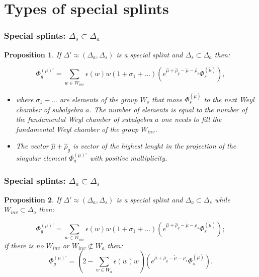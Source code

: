 \documentclass[pdftex]{beamer}
\newtheorem{Utv}{Proposition}
\theoremstyle{definition} \newtheorem{Def}{Definition}
\begin{document}
\section{Types of special splints}
\begin{frame}
  \frametitle{Special splints: $\Delta_s\subset\Delta_a$}
  \begin{Utv}
    If $\Delta'\approx\left(\Delta_a,\Delta_s\right)$ is a special splint and $\Delta_s\subset\Delta_a$ then:

    $$
    \Phi_g^{(\mu)'}=\sum_{w\in W_{inv}} \epsilon (w) w(1+\sigma_1+\dots)(e^{\hat\mu+\hat\rho_g-\tilde{\mu}-\tilde{\rho_s}}\Phi_s^{(\tilde{\mu})}),
    $$
    \begin{itemize}
      \item where $\sigma_1+\dots$ are elements of the group $W_s$ that move $\Phi_s^{(\tilde{\mu})}$ to the next Weyl chamber of subalgebra $a$. The number of elements is equal to the number of the fundamental Weyl chamber of subalgebra $a$ one needs to fill the fundamental Weyl chamber of the group $W_{inv}$. 

      \item The vector $\hat\mu+\hat\rho_g$ is vector of the highest lenght in the projection of the singular element $\Phi_g^{(\mu)'}$ with positive multiplicity.
      \end{itemize}
    \label{u3}
  \end{Utv}
\end{frame}

\begin{frame}
  \frametitle{Special splints: $\Delta_a\subset\Delta_s$}
  \begin{Utv}
    If $\Delta'\approx\left(\Delta_a,\Delta_s\right)$ is a special splint and $\Delta_a\subset\Delta_s$ while $W_{inv}\subset\Delta_a$ then:

    $$
    \Phi_g^{(\mu)'}=\sum_{w\in W_{inv}} \epsilon (w) w(1+\sigma_1+\dots)(e^{\hat\mu+\hat\rho_g-\tilde{\mu}-\rho_s}\Phi_s^{(\tilde{\mu})});
    $$
    if there is no $W_{inv}$ or $W_{inv}\not\subset W_a$ then:
    $$
    \Phi_g^{(\mu)'}=(2-\sum_{w\in W_a} \epsilon (w) w)(e^{\hat\mu+\hat\rho_g-\tilde{\mu}-\rho_s}\Phi_s^{(\tilde{\mu})}).
    $$
    \label{u2}
  \end{Utv}
\end{frame}
\end{document}
